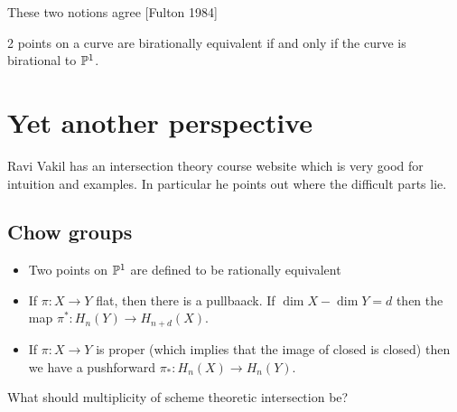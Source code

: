 \documentclass[12pt]{article}
\begin{document}
\hfill

These two notions agree [Fulton 1984]

\begin{example}
    2 points on a curve are birationally equivalent if and only if the curve is 
    birational to $\P^1$.
\end{example}

\section{Yet another perspective}
Ravi Vakil has an intersection theory course website which is very good for intuition
and examples. In particular he points out where the difficult parts lie.

\hfill

\subsection{Chow groups}
\begin{itemize}
    \item Two points on $\P^1$ are defined to be rationally equivalent
    \item If $\pi: X\to Y$ flat, then there is a pullbaack. If $\dim X - \dim Y = d$
    then the map $\pi^*:H_n(Y)\to H_{n+d}(X)$.
    \item If $\pi:X\to Y$ is proper (which implies that the image of closed is closed)
    then we have a pushforward $\pi_*:H_n(X)\to H_n(Y)$.
\end{itemize}

What should multiplicity of scheme theoretic intersection be?
\end{document}
